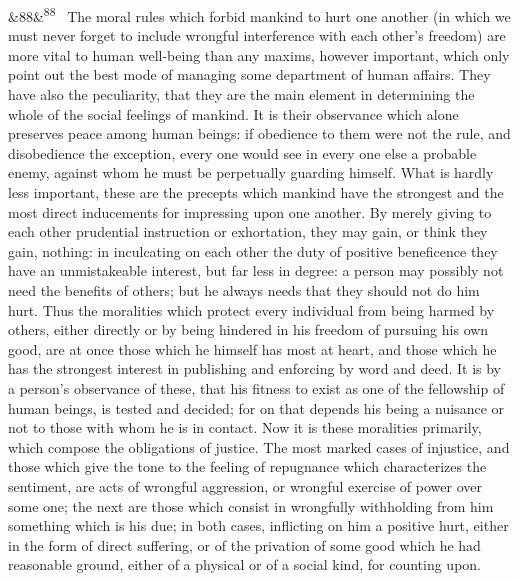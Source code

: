 \documentclass[12pt]{article}
\newcommand{\para}[1][]{\par\noindent\ifx&#1&\else\textsuperscript{\footnotesize #1}~\fi}
\begin{document}
\para[88] The moral rules which forbid mankind to hurt one another (in which we must never forget to include wrongful interference with each other's freedom) are more vital to human well-being than any maxims, however important, which only point out the best mode of managing some department of human affairs. They have also the peculiarity, that they are the main element in determining the whole of the social feelings of mankind. It is their observance which alone preserves peace among human beings: if obedience to them were not the rule, and disobedience the exception, every one would see in every one else a probable enemy, against whom he must be perpetually guarding himself. What is hardly less important, these are the precepts which mankind have the strongest and the most direct inducements for impressing upon one another. By merely giving to each other prudential instruction or exhortation, they may gain, or think they gain, nothing: in inculcating on each other the duty of positive beneficence they have an unmistakeable interest, but far less in degree: a person may possibly not need the benefits of others; but he always needs that they should not do him hurt. Thus the moralities which protect every individual from being harmed by others, either directly or by being hindered in his freedom of pursuing his own good, are at once those which he himself has most at heart, and those which he has the strongest interest in publishing and enforcing by word and deed. It is by a person's observance of these, that his fitness to exist as one of the fellowship of human beings, is tested and decided; for on that depends his being a nuisance or not to those with whom he is in contact. Now it is these moralities primarily, which compose the obligations of justice. The most marked cases of injustice, and those which give the tone to the feeling of repugnance which characterizes the sentiment, are acts of wrongful aggression, or wrongful exercise of power over some one; the next are those which consist in wrongfully withholding from him something which is his due; in both cases, inflicting on him a positive hurt, either in the form of direct suffering, or of the privation of some good which he had reasonable ground, either of a physical or of a social kind, for counting upon.
\end{document}
